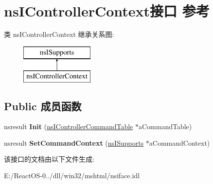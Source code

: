 \hypertarget{interfacens_i_controller_context}{}\section{ns\+I\+Controller\+Context接口 参考}
\label{interfacens_i_controller_context}
类 ns\+I\+Controller\+Context 继承关系图\+:\begin{figure}[H]
\begin{center}
\leavevmode
\includegraphics[height=2.000000cm]{interfacens_i_controller_context}
\end{center}
\end{figure}
\subsection*{Public 成员函数}
\begin{DoxyCompactItemize}
\item 
\mbox{\label{interfacens_i_controller_context_a357e43d4cde99ce1134f31114457302c}} 
nsresult {\bfseries Init} (\hyperlink{interfacens_i_supports}{ns\+I\+Controller\+Command\+Table} $\ast$a\+Command\+Table)
\item 
\mbox{\label{interfacens_i_controller_context_a3ba24b3b9c97d4c0dbc8f1a65dad95b0}} 
nsresult {\bfseries Set\+Command\+Context} (\hyperlink{interfacens_i_supports}{ns\+I\+Supports} $\ast$a\+Command\+Context)
\end{DoxyCompactItemize}


该接口的文档由以下文件生成\+:\begin{DoxyCompactItemize}
\item 
E\+:/\+React\+O\+S-\/0../dll/win32/mshtml/nsiface.\+idl\end{DoxyCompactItemize}
